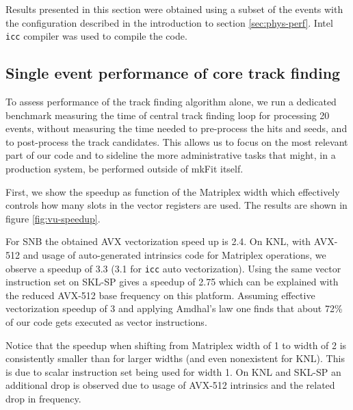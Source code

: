 \documentclass{webofc}
\def\mkfit{mkFit\xspace}
\def\stt#1{{\small\texttt{#1}}}
\begin{document}
Results presented in this section were obtained using a subset of the 
events with the configuration described in the introduction to section 
\ref{sec:phys-perf}. Intel \stt{icc} compiler was used to compile the
code.


\subsection{Single event performance of core track finding}

To assess performance of the track finding algorithm alone, we run a dedicated
benchmark measuring the time of central track finding loop for processing 20 
events, without measuring the time needed to pre-process the hits and seeds, 
and to post-process the track candidates. This allows us to focus on the most 
relevant part of our code and to sideline the more administrative tasks that 
might, in a production system, be performed outside of \mkfit itself.

First, we show the speedup as function of the Matriplex width which
effectively controls how many slots in the vector registers are used. The
results are shown in figure \ref{fig:vu-speedup}.

For SNB the obtained AVX vectorization speed up is 2.4. On KNL, with AVX-512
and usage of auto-generated intrinsics code for Matriplex operations, we
observe a speedup of 3.3 (3.1 for \stt{icc} auto vectorization). Using the same
vector instruction set on SKL-SP gives a speedup of 2.75 which can be explained
with the reduced AVX-512 base frequency on this platform. Assuming effective
vectorization speedup of 3 and applying Amdhal's law one finds that about 72\%
of our code gets executed as vector instructions.

Notice that the speedup when shifting from Matriplex width of 1 to width of 2
is consistently smaller than for larger widths (and even nonexistent for
KNL). This is due to scalar instruction set being used for width 1. On KNL and
SKL-SP an additional drop is observed due to usage of AVX-512 intrinsics and the
related drop in frequency.
\end{document}
